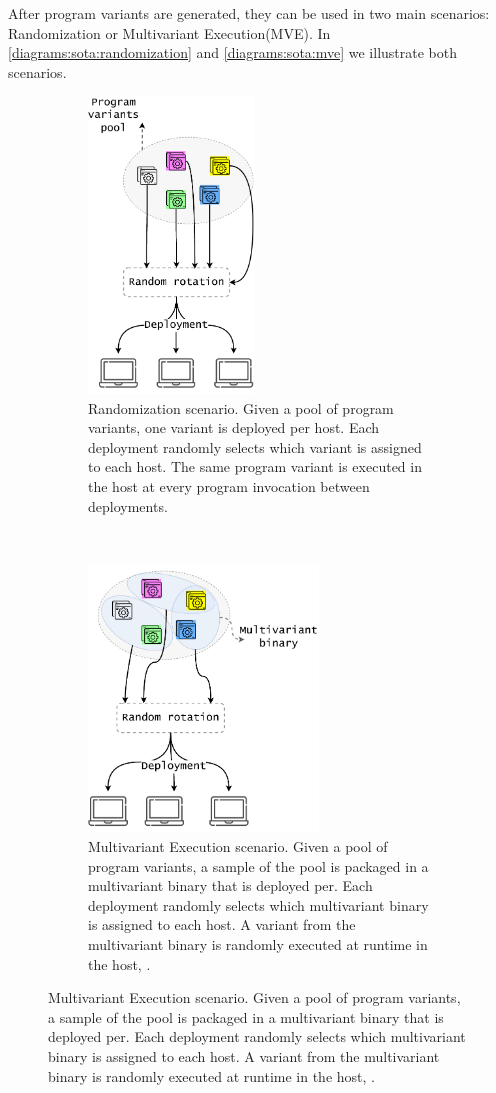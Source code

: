 After program variants are generated, they can be used in two main scenarios: Randomization or Multivariant Execution(MVE). In \autoref{diagrams:sota:randomization} and \autoref{diagrams:sota:mve} we illustrate both scenarios. 



\newcommand{\rulesep}{\unskip\ \vrule\ }
\begin{figure}[h]
    \centering
    \begin{subfigure}[t]{0.45\textwidth}
        \centering
        \includegraphics[height=3.1in]{diagrams/randomization.pdf}
        \vspace{0.5cm}
        \caption{Randomization scenario. Given a pool of program variants, one variant is deployed per host. Each deployment randomly selects which variant is assigned to each host. The same program variant is executed in the host at every program invocation between deployments. }        \label{diagrams:sota:randomization}

    \end{subfigure}
    \hspace{1.5mm}
    \rulesep
    \hspace{1.5mm}
    \begin{subfigure}[t]{0.45\textwidth}
        \centering
        \includegraphics[height=2.8in]{diagrams/mve.pdf}
        \caption{Multivariant Execution scenario. Given a pool of program variants, a sample of the pool is packaged in a multivariant binary that is deployed per. Each deployment randomly selects which multivariant binary is assigned to each host. A variant from the multivariant binary is randomly executed at runtime in the host, .}        \label{diagrams:sota:mve}


\end{subfigure}
\end{figure}
